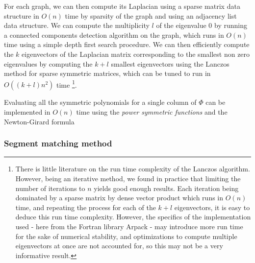 For each graph, we can then compute its Laplacian using a sparse matrix data structure in $O(n)$ time by sparsity of the graph and using an adjacency list data structure. We can compute the multiplicity $l$ of the eigenvalue $0$ by running a connected components detection algorithm on the graph, which runs in $O(n)$ time using a simple depth first search procedure. We can then efficiently compute the $k$ eigenvectors of the Laplacian matrix corresponding to the smallest non zero eigenvalues by computing the $k + l$ smallest eigenvectors using the Lanczos method for sparse symmetric matrices, which can be tuned to run in $O((k + l)n^2)$ time \footnote{
There is little literature on the run time complexity of the Lanczos algorithm. However, being an iterative method, we found in practice that limiting the number of iterations to $n$ yields good enough results. Each iteration being dominated by a sparse matrix by dense vector product which runs in $O(n)$ time, and repeating the process for each of the $k + l$ eigenvectors, it is easy to deduce this run time complexity. However, the specifics of the implementation used - here from the Fortran library Arpack - may introduce more run time for the sake of numerical stability, and optimizations to compute multiple eigenvectors at once are not accounted for, so this may not be a very informative result.
}.

Evaluating all the symmetric polynomials for a single column of $\Phi$ can be implemented in $O(n)$ time using the \emph{power symmetric functions} and the Newton-Girard formula

\subsubsection{Segment matching method}
\label{sec:segmentMatching}
